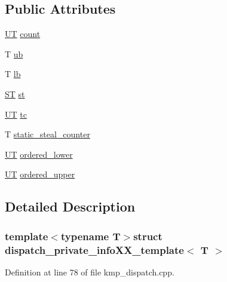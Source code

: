 \subsection*{Public Attributes}
\begin{DoxyCompactItemize}
\item 
\hyperlink{structdispatch__private__infoXX__template_a36c3bad85f8de302d9d6692f5e365adc}{U\-T} \hyperlink{structdispatch__private__infoXX__template_ac60eea68dbafe57cfd13dc82056c20e3}{count}
\item 
T \hyperlink{structdispatch__private__infoXX__template_a243c57f29d939bdbec44f77b55bc18e5}{ub}
\item 
T \hyperlink{structdispatch__private__infoXX__template_a2bbe8f513cfe2b671e820dfebc014ae4}{lb}
\item 
\hyperlink{structdispatch__private__infoXX__template_afec493a50230162ebb49ef3b83da3b43}{S\-T} \hyperlink{structdispatch__private__infoXX__template_a962f937d3338dfb7e860eb7d451c6a1f}{st}
\item 
\hyperlink{structdispatch__private__infoXX__template_a36c3bad85f8de302d9d6692f5e365adc}{U\-T} \hyperlink{structdispatch__private__infoXX__template_a8cda3453861f128894b5f26df19e401f}{tc}
\item 
T \hyperlink{structdispatch__private__infoXX__template_a96f4be72188c2f8386b83605fbdfa82c}{static\-\_\-steal\-\_\-counter}
\item 
\hyperlink{structdispatch__private__infoXX__template_a36c3bad85f8de302d9d6692f5e365adc}{U\-T} \hyperlink{structdispatch__private__infoXX__template_aa7422dc1e95ed19c25a6a8781fd2f778}{ordered\-\_\-lower}
\item 
\hyperlink{structdispatch__private__infoXX__template_a36c3bad85f8de302d9d6692f5e365adc}{U\-T} \hyperlink{structdispatch__private__infoXX__template_ae5b4524bb3ea2f6fced39f058a72b230}{ordered\-\_\-upper}
\end{DoxyCompactItemize}


\subsection{Detailed Description}
\subsubsection*{template$<$typename T$>$struct dispatch\-\_\-private\-\_\-info\-X\-X\-\_\-template$<$ T $>$}



Definition at line 78 of file kmp\-\_\-dispatch.\-cpp.



